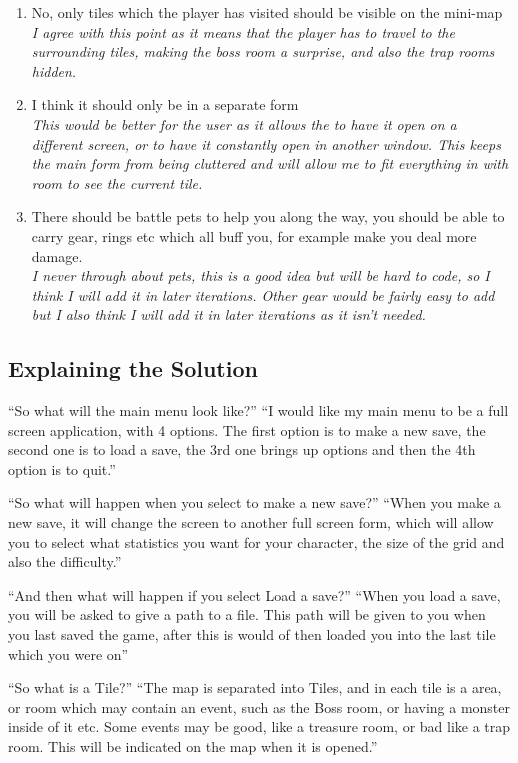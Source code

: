 \documentclass[12pt]{article}
\begin{document}
\begin{enumerate}
	\item{No, only tiles which the player has visited should be visible on the mini-map \\}
	\em{I agree with this point as it means that the player has to travel to the surrounding tiles, making the boss room a surprise, and also the trap rooms hidden.}
	
	\item{I think it should only be in a separate form \\}
	\em{This would be better for the user as it allows the to have it open on a different screen, or to have it constantly open in another window. This keeps the main form from being cluttered and will allow me to fit everything in with room to see the current tile.}
	
	\item{There should be battle pets to help you along the way, you should be able to carry gear, rings etc which all buff you, for example make you deal more damage. \\}
	\em{I never through about pets, this is a good idea but will be hard to code, so I think I will add it in later iterations. Other gear would be fairly easy to add but I also think I will add it in later iterations as it isn't needed.}
\end{enumerate}
			
		\subsection{Explaining the Solution}

“So what will the main menu look like?”
“I would like my main menu to be a full screen application, with 4 options. The first option is to make a new save, the second one is to load a save, the 3rd one brings up options and then the 4th option is to quit.”

“So what will happen when you select to make a new save?”
“When you make a new save, it will change the screen to another full screen form, which will allow you to select what statistics you want for your character, the size of the grid and also the difficulty.”

“And then what will happen if you select Load a save?”
“When you load a save, you will be asked to give a path to a file. This path will be given to you when you last saved the game, after this is would of then loaded you into the last tile which you were on”

“So what is a Tile?”
“The map is separated into Tiles, and in each tile is a area, or room which may contain an event, such as the Boss room, or having a monster inside of it etc. Some events may be good, like a treasure room, or bad like a trap room. This will be indicated on the map when it is opened.”
\end{document}
